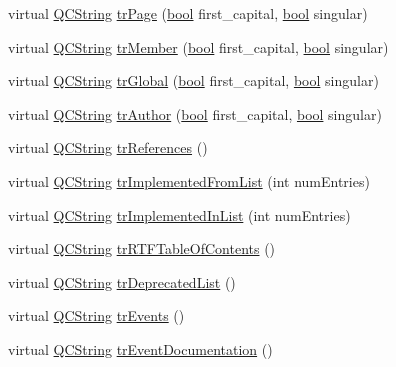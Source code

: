 \begin{DoxyCompactItemize}
\item 
virtual \hyperlink{class_q_c_string}{Q\+C\+String} \hyperlink{class_translator_greek_ab33b0e9ea6a0ae4816ac8616cb32356d}{tr\+Page} (\hyperlink{qglobal_8h_a1062901a7428fdd9c7f180f5e01ea056}{bool} first\+\_\+capital, \hyperlink{qglobal_8h_a1062901a7428fdd9c7f180f5e01ea056}{bool} singular)
\item 
virtual \hyperlink{class_q_c_string}{Q\+C\+String} \hyperlink{class_translator_greek_a901c69bdd4917178151850bca6972525}{tr\+Member} (\hyperlink{qglobal_8h_a1062901a7428fdd9c7f180f5e01ea056}{bool} first\+\_\+capital, \hyperlink{qglobal_8h_a1062901a7428fdd9c7f180f5e01ea056}{bool} singular)
\item 
virtual \hyperlink{class_q_c_string}{Q\+C\+String} \hyperlink{class_translator_greek_a07d0ebd30a35e4c1cfa6ec97de0ce306}{tr\+Global} (\hyperlink{qglobal_8h_a1062901a7428fdd9c7f180f5e01ea056}{bool} first\+\_\+capital, \hyperlink{qglobal_8h_a1062901a7428fdd9c7f180f5e01ea056}{bool} singular)
\item 
virtual \hyperlink{class_q_c_string}{Q\+C\+String} \hyperlink{class_translator_greek_aef3b638fa37328fce32969531aaa06a8}{tr\+Author} (\hyperlink{qglobal_8h_a1062901a7428fdd9c7f180f5e01ea056}{bool} first\+\_\+capital, \hyperlink{qglobal_8h_a1062901a7428fdd9c7f180f5e01ea056}{bool} singular)
\item 
virtual \hyperlink{class_q_c_string}{Q\+C\+String} \hyperlink{class_translator_greek_a499e6f16ac7b87a751d8a3703a202e99}{tr\+References} ()
\item 
virtual \hyperlink{class_q_c_string}{Q\+C\+String} \hyperlink{class_translator_greek_ad64ceaa558279f1b67804889286beaa5}{tr\+Implemented\+From\+List} (int num\+Entries)
\item 
virtual \hyperlink{class_q_c_string}{Q\+C\+String} \hyperlink{class_translator_greek_a8fdacd5a6741161cc42567debd0f59d7}{tr\+Implemented\+In\+List} (int num\+Entries)
\item 
virtual \hyperlink{class_q_c_string}{Q\+C\+String} \hyperlink{class_translator_greek_ae2fa69fe45a2c3625163018619f9ae44}{tr\+R\+T\+F\+Table\+Of\+Contents} ()
\item 
virtual \hyperlink{class_q_c_string}{Q\+C\+String} \hyperlink{class_translator_greek_afe33ff0d5a6a6ac3cc62d8f55f64a137}{tr\+Deprecated\+List} ()
\item 
virtual \hyperlink{class_q_c_string}{Q\+C\+String} \hyperlink{class_translator_greek_a5df9b859596cb0b5836cbaf9c04d6572}{tr\+Events} ()
\item 
virtual \hyperlink{class_q_c_string}{Q\+C\+String} \hyperlink{class_translator_greek_a267fa4466f72a89df428d4fa1cc518b0}{tr\+Event\+Documentation} ()

\end{DoxyCompactItemize}
